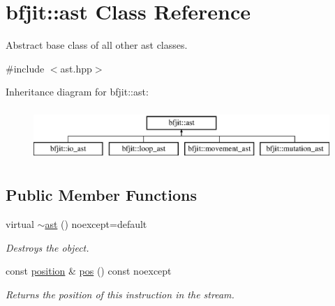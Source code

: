 \hypertarget{classbfjit_1_1ast}{}\section{bfjit\+:\+:ast Class Reference}
\label{classbfjit_1_1ast}


Abstract base class of all other ast classes.  




{\ttfamily \#include $<$ast.\+hpp$>$}

Inheritance diagram for bfjit\+:\+:ast\+:\begin{figure}[H]
\begin{center}
\leavevmode
\includegraphics[height=2.000000cm]{classbfjit_1_1ast}
\end{center}
\end{figure}
\subsection*{Public Member Functions}
\begin{DoxyCompactItemize}
\item 
\hypertarget{classbfjit_1_1ast_a031935f8ba5af7185e8d75d67c1973dc}{}\label{classbfjit_1_1ast_a031935f8ba5af7185e8d75d67c1973dc} 
virtual \hyperlink{classbfjit_1_1ast_a031935f8ba5af7185e8d75d67c1973dc}{$\sim$ast} () noexcept=default
\begin{DoxyCompactList}\small\item\em Destroys the object. \end{DoxyCompactList}\item 
\hypertarget{classbfjit_1_1ast_a748b75683a33e11ad87b907ba0118c3d}{}\label{classbfjit_1_1ast_a748b75683a33e11ad87b907ba0118c3d} 
const \hyperlink{classbfjit_1_1position}{position} \& \hyperlink{classbfjit_1_1ast_a748b75683a33e11ad87b907ba0118c3d}{pos} () const noexcept
\begin{DoxyCompactList}\small\item\em Returns the position of this instruction in the stream. \end{DoxyCompactList}\end{DoxyCompactItemize}
